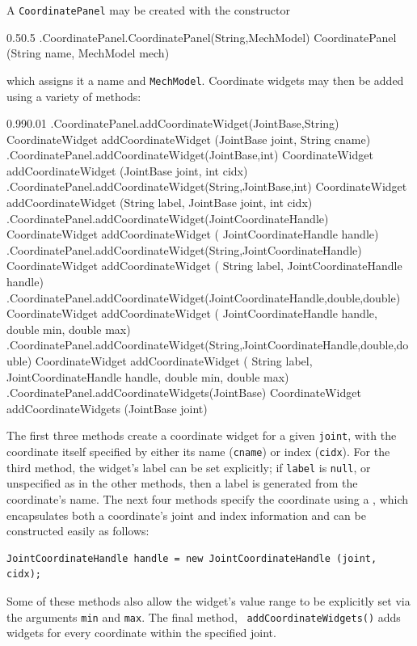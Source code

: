 A {\tt CoordinatePanel} may be created with the constructor
%
\begin{methodtable}{0.5}{0.5}
%
\methodentry
{\gui.CoordinatePanel.CoordinatePanel(String,MechModel)}%
{CoordinatePanel (String name, MechModel mech)}%
{\ }%
%
\end{methodtable}
%
which assigns it a name and {\tt MechModel}. Coordinate widgets may
then be added using a variety of methods:
%
\begin{methodtable}{0.99}{0.01}
\midline
%
\methodentry
{\gui.CoordinatePanel.addCoordinateWidget(JointBase,String)}%
{CoordinateWidget addCoordinateWidget (JointBase joint, String cname)}%
{\ }%
%
\methodentry
{\gui.CoordinatePanel.addCoordinateWidget(JointBase,int)}%
{CoordinateWidget addCoordinateWidget (JointBase joint, int cidx)}%
{\ }%
%
\methodentry
{\gui.CoordinatePanel.addCoordinateWidget(String,JointBase,int)}%
{CoordinateWidget addCoordinateWidget (String label, JointBase joint, int cidx)}%
{\ }%
%
\methodspace{0.5em}%
%
\methodentry
{\gui.CoordinatePanel.addCoordinateWidget(JointCoordinateHandle)}%
{CoordinateWidget addCoordinateWidget (%
JointCoordinateHandle handle)}%
{\ }%
%
\methodentry
{\gui.CoordinatePanel.addCoordinateWidget(String,JointCoordinateHandle)}%
{CoordinateWidget addCoordinateWidget (%
String label, JointCoordinateHandle handle)}%
{\ }%
%
\methodentry
{\gui.CoordinatePanel.addCoordinateWidget(JointCoordinateHandle,double,double)}%
{CoordinateWidget addCoordinateWidget (%
JointCoordinateHandle handle, double min, double max)}%
{\ }%
%
\methodentry
{\gui.CoordinatePanel.addCoordinateWidget(String,JointCoordinateHandle,double,double)}%
{CoordinateWidget addCoordinateWidget (%
String label, JointCoordinateHandle handle, double min, double max)}%
{\ }%
%
\methodspace{0.5em}%
%
\methodentry
{\gui.CoordinatePanel.addCoordinateWidgets(JointBase)}%
{CoordinateWidget addCoordinateWidgets (JointBase joint)}%
{\ }%
%
\midline
\end{methodtable}
%
The first three methods create a coordinate widget for a given {\tt joint},
with the coordinate itself specified by either its name ({\tt cname}) or index
({\tt cidx}). For the third method, the widget's label can be set explicitly;
if {\tt label} is {\tt null}, or unspecified as in the other methods, then a
label is generated from the coordinate's name.  The next four methods specify
the coordinate using a , which
encapsulates both a coordinate's joint and index information and can be
constructed easily as follows:
%
\begin{lstlisting}[]
   JointCoordinateHandle handle = new JointCoordinateHandle (joint, cidx);
\end{lstlisting}
%
Some of these methods also allow the widget's value range to be explicitly set
via the arguments {\tt min} and {\tt max}.  The final method, {\tt
addCoordinateWidgets()} adds widgets for every coordinate within the specified
joint.

